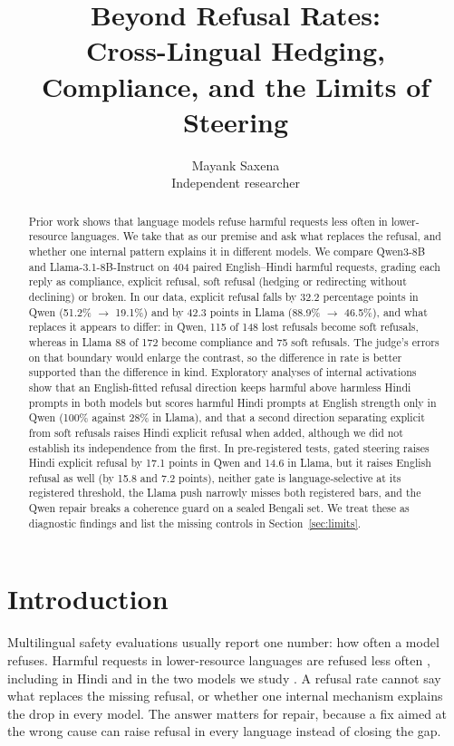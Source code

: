 \documentclass[11pt]{article}
\title{Beyond Refusal Rates:\\[2pt]
\large Cross-Lingual Hedging, Compliance, and the Limits of Steering}
\author{Mayank Saxena\\ Independent researcher}
\date{}
\begin{document}
\maketitle

\begin{abstract}
Prior work shows that language models refuse harmful requests less often in lower-resource languages. We take that as our premise and ask what replaces the refusal, and whether one internal pattern explains it in different models. We compare Qwen3-8B and Llama-3.1-8B-Instruct on 404 paired English--Hindi harmful requests, grading each reply as compliance, explicit refusal, soft refusal (hedging or redirecting without declining) or broken. In our data, explicit refusal falls by 32.2 percentage points in Qwen (51.2\% $\to$ 19.1\%) and by 42.3 points in Llama (88.9\% $\to$ 46.5\%), and what replaces it appears to differ: in Qwen, 115 of 148 lost refusals become soft refusals, whereas in Llama 88 of 172 become compliance and 75 soft refusals. The judge's errors on that boundary would enlarge the contrast, so the difference in rate is better supported than the difference in kind. Exploratory analyses of internal activations show that an English-fitted refusal direction keeps harmful above harmless Hindi prompts in both models but scores harmful Hindi prompts at English strength only in Qwen (100\% against 28\% in Llama), and that a second direction separating explicit from soft refusals raises Hindi explicit refusal when added, although we did not establish its independence from the first. In pre-registered tests, gated steering raises Hindi explicit refusal by 17.1 points in Qwen and 14.6 in Llama, but it raises English refusal as well (by 15.8 and 7.2 points), neither gate is language-selective at its registered threshold, the Llama push narrowly misses both registered bars, and the Qwen repair breaks a coherence guard on a sealed Bengali set. We treat these as diagnostic findings and list the missing controls in Section~\ref{sec:limits}.
\end{abstract}

\section{Introduction}
Multilingual safety evaluations usually report one number: how often a model refuses. Harmful requests in lower-resource languages are refused less often \citep{yong2023lowresource,deng2024multijail,wang2024xsafety}, including in Hindi and in the two models we study \citep{mondal2026indicsafeeval,aziz2026action}. A refusal rate cannot say what replaces the missing refusal, or whether one internal mechanism explains the drop in every model. The answer matters for repair, because a fix aimed at the wrong cause can raise refusal in every language instead of closing the gap.
\end{document}
